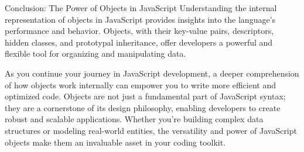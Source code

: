 Conclusion: The Power of Objects in JavaScript
Understanding the internal representation of objects in JavaScript provides insights into the language's performance and behavior. Objects, with their key-value pairs, descriptors, hidden classes, and prototypal inheritance, offer developers a powerful and flexible tool for organizing and manipulating data.

As you continue your journey in JavaScript development, a deeper comprehension of how objects work internally can empower you to write more efficient and optimized code. Objects are not just a fundamental part of JavaScript syntax; they are a cornerstone of its design philosophy, enabling developers to create robust and scalable applications. Whether you're building complex data structures or modeling real-world entities, the versatility and power of JavaScript objects make them an invaluable asset in your coding toolkit.
